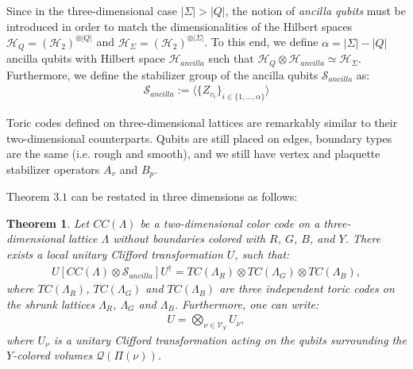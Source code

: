 \documentclass[12pt]{article}
\newtheorem{theorem}{Theorem}[section]
\theoremstyle{definition}
\begin{document}
Since in the three-dimensional case $|\Sigma| > |Q|$, the notion of \emph{ancilla qubits} must be introduced in order to match the dimensionalities of the Hilbert spaces $\mathcal{H}_Q = (\mathcal{H}_2)^{\otimes|Q|}$ and $\mathcal{H}_\Sigma = (\mathcal{H}_2)^{\otimes|\Sigma|}$. To this end, we define $\alpha = |\Sigma|-|Q|$ ancilla qubits with Hilbert space $\mathcal{H}_{ancilla}$ such that $\mathcal{H}_Q\otimes\mathcal{H}_{ancilla}\simeq\mathcal{H}_\Sigma$. Furthermore, we define the stabilizer group of the ancilla qubits $\mathcal{S}_{ancilla}$ as:
    \begin{align}
        \mathcal{S}_{ancilla} := \langle\{Z_{v_i}\}_{i\in\{1,...,\alpha\}}\rangle
    \end{align}

Toric codes defined on three-dimensional lattices are remarkably similar to their two-dimensional counterparts. Qubits are still placed on edges, boundary types are the same (i.e. rough and smooth), and we still have vertex and plaquette stabilizer operators $A_v$ and $B_p$.\newline

Theorem $3.1$ can be restated in three dimensions as follows:
    \begin{theorem}
        Let $CC(\Lambda)$ be a two-dimensional color code on a three-dimensional lattice $\Lambda$ without boundaries colored with $R$, $G$, $B$, and $Y$. There exists a local unitary Clifford transformation $U$, such that:
            \begin{align}
                U[CC(\Lambda)\otimes\mathcal{S}_{ancilla}]U^\dagger = TC(\Lambda_R)\otimes TC(\Lambda_G)\otimes TC(\Lambda_B),
            \end{align}
        where $TC(\Lambda_R)$, $TC(\Lambda_G)$ and $TC(\Lambda_B)$ are three independent toric codes on the shrunk lattices $\Lambda_R$, $\Lambda_G$ and $\Lambda_B$. Furthermore, one can write:
            \begin{align}
                U = \bigotimes_{\nu\in \mathcal{V}_Y}U_\nu,
            \end{align}
        where $U_\nu$ is a unitary Clifford transformation acting on the qubits surrounding the $Y$-colored volumes $\mathcal{Q}(\Pi(\nu))$.
    \end{theorem}
\end{document}
